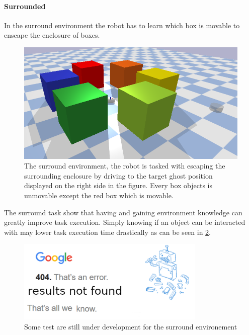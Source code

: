 
\paragraph{Surrounded} In the surround environment the robot has to learn which box is movable to enscape the enclosure of boxes.\bs
\begin{figure}[H]
    \centering
    \includegraphics[width=13cm]{figures/tests/surrounded}
    \caption{The surround environment, the robot is tasked with escaping the surrounding enclosure by driving to the target ghost position displayed on the right side in the figure. Every box objects is unmovable except the red box which is movable.}%
    \label{fig:benchmark_surround}
\end{figure}
The surround task show that having and gaining environment knowledge can greatly improve task execution. Simply knowing if an object can be interacted with may lower task execution time drastically as can be seen in \cref{fig:results_surround}.\bs

\begin{figure}[H]
    \centering
    \includegraphics[width=9cm]{figures/tests/404_not_found}
    \caption{Some test are still under development for the surround environement}%
    \label{fig:results_surround}
\end{figure}


